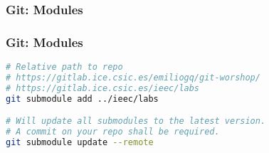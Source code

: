 \begin{frame}

\frametitle{Git: Modules}


\end{frame}

\begin{frame}[fragile]

\frametitle{Git: Modules}

\begin{lstlisting}[language=Bash]
# Relative path to repo
# https://gitlab.ice.csic.es/emiliogq/git-worshop/
# https://gitlab.ice.csic.es/ieec/labs
git submodule add ../ieec/labs

# Will update all submodules to the latest version. 
# A commit on your repo shall be required.
git submodule update --remote
\end{lstlisting}


\end{frame}
